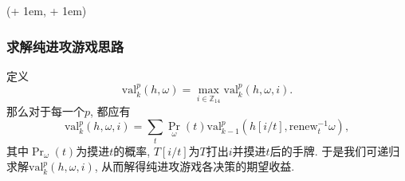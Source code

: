 \documentclass[xcolor=dvipsnames]{ctexbeamer}
\newcommand{\FrameTextSE}[1]{
    \begin{textblock*}{\paperwidth}(\textwidth + 1em, \textheight + 1em)
        #1
    \end{textblock*}
}
\newcommand{\hand}{h}
\newcommand{\base}{\omega}
\let\oldframe\frame
\let\oldendframe\endframe
\renewenvironment{frame}
    {\oldframe\FrameTextSE{\small\color{blue}{\crono}}}
    {\oldendframe}
\begin{document}
    \begin{frame}
        \frametitle{求解纯进攻游戏思路}
        定义
        \[\mathrm{val}_{k}^{p}(\hand, \base)=
        \max_{i\in\mathbb{Z}_{14}}{\mathrm{val}_{k}^{p}(\hand, \base, i)}.\]
        那么对于每一个$p$, 都应有
        \[\mathrm{val}_{k}^{p}(\hand, \base, i)=
        \sum_{t}{\Pr_{\base}}(t)\mathrm{val}_{k-1}^{p}(\hand[i/t],
        \mathrm{renew}_{t}^{-1}{\base}),\]
        其中$\Pr_{\base}(t)$为摸进$t$的概率,
        $T[i/t]$为$T$打出$i$并摸进$t$后的手牌.
        于是我们可递归求解$\mathrm{val}_{k}^{p}(\hand, \base, i)$,
        从而解得纯进攻游戏各决策的期望收益.
    \end{frame}
\end{document}
